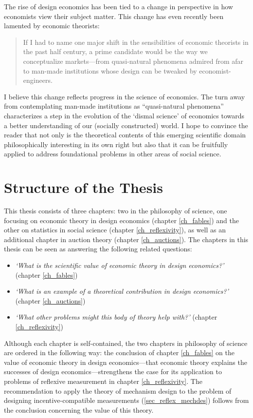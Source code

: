 The rise of design economics has been tied to a change in perspective in how economists view their subject matter. This change has even recently been lamented by economic theorists:
\begin{quote}
    If I had to name one major shift in the sensibilities of economic theorists in the past half century, a prime candidate would be the way we conceptualize markets---from quasi-natural phenomena admired from afar to man-made institutions whose design can be tweaked by economist-engineers. \autocite[p137]{spiegler2024}
\end{quote}
\noindent I believe this change reflects progress in the science of economics. The turn away from contemplating man-made institutions as ``quasi-natural phenomena'' characterizes a step in the evolution of the `dismal science' of economics towards a better understanding of our (socially constructed) world. I hope to convince the reader that not only is the theoretical contents of this emerging scientific domain philosophically interesting in its own right but also that it can be fruitfully applied to address foundational problems in other areas of social science.


\section{Structure of the Thesis}

This thesis consists of three chapters: two in the philosophy of science, one focusing on economic theory in design economics (chapter \ref{ch_fables}) and the other on statistics in social science (chapter \ref{ch_reflexivity}), as well as an additional chapter in auction theory (chapter \ref{ch_auctions}). The chapters in this thesis can be seen as answering the following related questions:

\begin{itemize}
	\item \textit{`What is the scientific value of economic theory in design economics?'} (chapter \ref{ch_fables})

	\item \textit{`What is an example of a theoretical contribution in design economics?'} (chapter \ref{ch_auctions})

	\item \textit{`What other problems might this body of theory help with?'} (chapter \ref{ch_reflexivity})
\end{itemize}

\noindent Although each chapter is self-contained, the two chapters in philosophy of science are ordered in the following way: the conclusion of chapter \ref{ch_fables} on the value of economic theory in design economics---that economic theory explains the successes of design economics---strengthens the case for its application to problems of reflexive measurement in chapter \ref{ch_reflexivity}. The recommendation to apply the theory of mechanism design to the problem of designing incentive-compatible measurements (\ref{sec_reflex_mechdes}) follows from the conclusion concerning the value of this theory.

